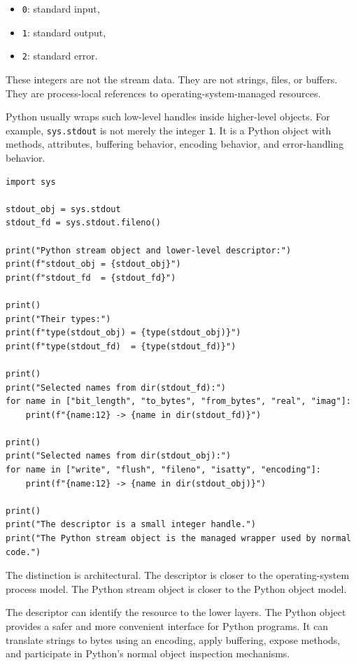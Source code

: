 \begin{itemize}
    \item \texttt{0}: standard input,
    \item \texttt{1}: standard output,
    \item \texttt{2}: standard error.
\end{itemize}

These integers are not the stream data. They are not strings, files, or buffers. They are process-local references to operating-system-managed resources.

Python usually wraps such low-level handles inside higher-level objects. For example, \texttt{sys.stdout} is not merely the integer \texttt{1}. It is a Python object with methods, attributes, buffering behavior, encoding behavior, and error-handling behavior.

\begin{verbatim}
import sys

stdout_obj = sys.stdout
stdout_fd = sys.stdout.fileno()

print("Python stream object and lower-level descriptor:")
print(f"stdout_obj = {stdout_obj}")
print(f"stdout_fd  = {stdout_fd}")

print()
print("Their types:")
print(f"type(stdout_obj) = {type(stdout_obj)}")
print(f"type(stdout_fd)  = {type(stdout_fd)}")

print()
print("Selected names from dir(stdout_fd):")
for name in ["bit_length", "to_bytes", "from_bytes", "real", "imag"]:
    print(f"{name:12} -> {name in dir(stdout_fd)}")

print()
print("Selected names from dir(stdout_obj):")
for name in ["write", "flush", "fileno", "isatty", "encoding"]:
    print(f"{name:12} -> {name in dir(stdout_obj)}")

print()
print("The descriptor is a small integer handle.")
print("The Python stream object is the managed wrapper used by normal code.")
\end{verbatim}

The distinction is architectural. The descriptor is closer to the operating-system process model. The Python stream object is closer to the Python object model.

The descriptor can identify the resource to the lower layers. The Python object provides a safer and more convenient interface for Python programs. It can translate strings to bytes using an encoding, apply buffering, expose methods, and participate in Python's normal object inspection mechanisms.

